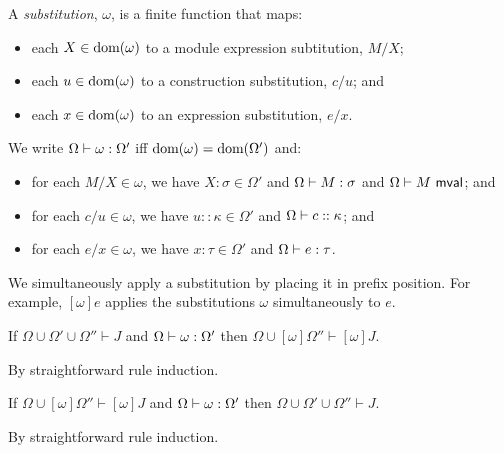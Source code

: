 A \emph{substitution}, $\omega$, is a finite function that maps:
\begin{itemize}
\item each $X \in \text{dom}(\omega)$ to a module expression subtitution, $M/X$; 
\item each $u \in \text{dom}(\omega)$ to a construction substitution, $c/u$; and 
\item each $x \in \text{dom}(\omega)$ to an expression substitution, $e/x$.
\end{itemize}

We write $\Omega \vdash \omega : \Omega'$ iff $\text{dom}(\omega)=\text{dom}(\Omega')$ and:
\begin{itemize}
\item for each $M/X \in \omega$, we have $X : \sigma \in \Omega'$ and $\Omega \vdash M : \sigma$ and $\Omega \vdash M~\mathsf{mval}$; and
\item for each $c/u \in \omega$, we have $u :: \kappa \in \Omega'$ and $\Omega \vdash c :: \kappa$; and 
\item for each $e/x \in \omega$, we have $x : \tau \in \Omega'$ and $\Omega \vdash e : \tau$.
\end{itemize}

We simultaneously apply a substitution by placing it in prefix position. For example, $[\omega]e$ applies the substitutions $\omega$ simultaneously to $e$.

\begin{lemma}[Substitution]\label{lemma:substitution-P} If $\Omega \cup \Omega' \cup \Omega'' \vdash J$ and $\Omega \vdash \omega : \Omega'$ then $\Omega \cup [\omega]\Omega'' \vdash [\omega]J$.
\end{lemma}
\begin{proof-sketch} By straightforward rule induction. 
\end{proof-sketch}

\begin{lemma}[Decomposition]\label{lemma:decomposition-P} 
If $\Omega \cup [\omega]\Omega'' \vdash [\omega]J$ and $\Omega \vdash \omega : \Omega'$ then $\Omega \cup \Omega' \cup \Omega'' \vdash J$.
\end{lemma}
\begin{proof-sketch} By straightforward rule induction.
\end{proof-sketch}


